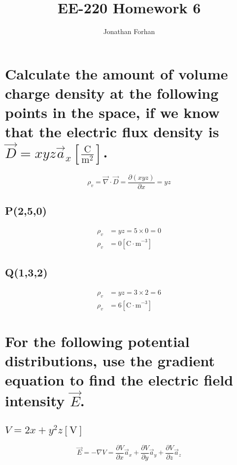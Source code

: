 \documentclass[14pt]{extarticle}
\title{EE-220 Homework 6}
\author{Jonathan Forhan}
\date{ }
\begin{document}
\maketitle

\boldmath
\section{Calculate the amount of volume charge density at the following points in the space,
  if we know that the electric flux density is $\vec{D}=xyz\vec{a}_x\left[\frac{\mathrm{C}}{\mathrm{m}^2}\right]$.}
\unboldmath

$$\rho_v=\vec{\nabla}\cdot\vec{D}=\frac{\partial (xyz)}{\partial x}=yz$$

\boldmath
\subsection{P(2,5,0)}
\unboldmath

\[
	\begin{aligned}
		\rho_v & =yz=5\times0=0                        \\
		\rho_v & =0\left[\mathrm{C\cdot m}^{-3}\right]
	\end{aligned}
\]

\boldmath
\subsection{Q(1,3,2)}
\unboldmath

\[
	\begin{aligned}
		\rho_v & =yz=3\times2=6                        \\
		\rho_v & =6\left[\mathrm{C\cdot m}^{-3}\right]
	\end{aligned}
\]

\boldmath
\section{For the following potential distributions, use the gradient equation to find
  the electric field intensity $\vec{E}$.}
\unboldmath

\boldmath
\subsection{$V=2x+y^2z[\mathrm{V}]$}
\unboldmath

$$\vec{E}=-\nabla V=\frac{\partial V}{\partial x}\vec{a}_x+\frac{\partial V}{\partial y}\vec{a}_y+\frac{\partial V}{\partial z}\vec{a}_z$$
\end{document}

